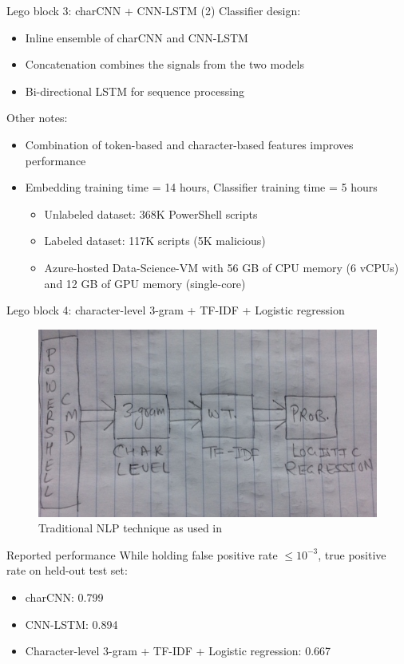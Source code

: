 \documentclass[10pt]{beamer}
\begin{document}
\begin{frame}{Lego block 3: charCNN + CNN-LSTM (2)}
	Classifier design:
	\begin{itemize}
		\item Inline ensemble of charCNN and CNN-LSTM
		\item Concatenation combines the signals from the two models
		\item Bi-directional LSTM for sequence processing
	\end{itemize}
	Other notes:
	\begin{itemize}
		\item Combination of token-based and character-based features improves performance
		\item Embedding training time = 14 hours, Classifier training time = 5 hours
		\begin{itemize}
			\item Unlabeled dataset: 368K PowerShell scripts
			\item Labeled dataset: 117K scripts (5K malicious)
			\item Azure-hosted Data-Science-VM with 56 GB of CPU memory (6 vCPUs) and 12 GB of GPU memory (single-core)
		\end{itemize}
	\end{itemize}
\end{frame}

\begin{frame}{Lego block 4: character-level 3-gram + TF-IDF + Logistic regression}
	\begin{figure}
		\includegraphics[scale=0.50]{3gram-tfidf-logistic}
		\caption{Traditional NLP technique as used in \cite{amsi2019}}
	\end{figure}
\end{frame}

\begin{frame}{Reported performance}
        While holding false positive rate $\le 10^{-3}$, true positive rate on held-out test set:
        \begin{itemize}
		\item charCNN: 0.799
		\item CNN-LSTM: 0.894
		\item Character-level 3-gram + TF-IDF + Logistic regression: 0.667
        \end{itemize}
\end{frame}
\end{document}
